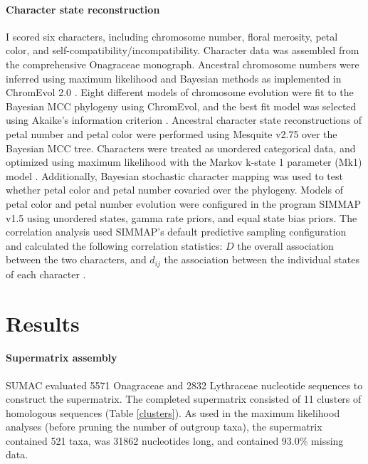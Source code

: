 \documentclass[review]{elsarticle}
\begin{document}
\paragraph{Character state reconstruction}
I scored six characters, including
chromosome number, floral merosity, petal color, and self-compatibility/incompatibility. 
Character data was assembled from the comprehensive \citet{wagner2007revised} Onagraceae monograph.
Ancestral chromosome numbers were inferred using maximum likelihood and Bayesian methods 
as implemented in ChromEvol 2.0 \citep{chromevol}.
Eight different models of chromosome evolution were fit to the Bayesian MCC phylogeny using ChromEvol,
and the best fit model was selected using Akaike's information criterion \citep{aic}.
Ancestral character state reconstructions of petal number and petal color were performed using Mesquite v2.75 \citep{mesquite}
over the Bayesian MCC tree.
Characters were treated as unordered categorical data, and optimized using maximum likelihood
with the Markov k-state 1 parameter (Mk1) model \citep{lewis2001likelihood}.
Additionally, Bayesian stochastic character mapping \citep{Huelsenbeck2003} was used to test whether
petal color and petal number covaried over the phylogeny. 
Models of petal color and petal number evolution
were configured in the program SIMMAP v1.5 \citep{bollback2006simmap}
using unordered states, gamma rate priors, and equal state bias priors.
The correlation analysis used SIMMAP's default
predictive sampling configuration
and calculated the following correlation statistics: 
$D$ the overall association between
the two characters, and $d_{ij}$ the association between the
individual states of each character \citep{Huelsenbeck2003}.



\section{Results}


\paragraph{Supermatrix assembly}
SUMAC evaluated 5571 Onagraceae and 2832 Lythraceae nucleotide sequences to construct the supermatrix. 
The completed supermatrix consisted of 11 clusters of homologous sequences (Table \ref{clusters}).
As used in the maximum likelihood analyses (before pruning the number of outgroup taxa), 
the supermatrix contained 521 taxa, was 31862 nucleotides long, and contained 93.0\% missing data.
\end{document}
